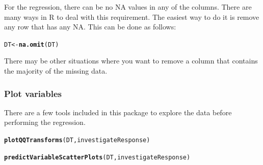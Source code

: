 \documentclass[a4paper,11pt]{article}\usepackage[]{graphicx}\usepackage[]{color}
\makeatletter
\newcommand{\hlkwd}[1]{\textcolor[rgb]{0.737,0.353,0.396}{\textbf{#1}}}%
\newenvironment{kframe}{%
 \def\at@end@of@kframe{}%
 \ifinner\ifhmode%
  \def\at@end@of@kframe{\end{minipage}}%
  \begin{minipage}{\columnwidth}%
 \fi\fi%
 \def\FrameCommand##1{\hskip\@totalleftmargin \hskip-\fboxsep
 \colorbox{shadecolor}{##1}\hskip-\fboxsep
     \hskip-\linewidth \hskip-\@totalleftmargin \hskip\columnwidth}%
 \MakeFramed {\advance\hsize-\width
   \@totalleftmargin\z@ \linewidth\hsize
   \@setminipage}}%
 {\par\unskip\endMakeFramed%
 \at@end@of@kframe}
\newenvironment{knitrout}{}{} %
\makeatother
\begin{document}
For the regression, there can be no NA values in any of the columns. There are many ways in R to deal with this requirement. The easiest way to do it is remove any row that has any NA. This can be done as follows:

\begin{knitrout}
\color{fgcolor}\begin{kframe}
\begin{alltt}
DT <- \hlkwd{na.omit}(DT)
\end{alltt}


{\ttfamily\noindent\bfseries\color{errorcolor}{Error: object 'DT' not found}}\end{kframe}
\end{knitrout}


There may be other situations where you want to remove a column that contains the majority of the missing data.

\subsubsection{Plot variables}
There are a few tools included in this package to explore the data before performing the regression.

\begin{knitrout}
\color{fgcolor}\begin{kframe}
\begin{alltt}
\hlkwd{plotQQTransforms}(DT,investigateResponse)
\end{alltt}


{\ttfamily\noindent\bfseries\color{errorcolor}{Error: object 'DT' not found}}\end{kframe}
\end{knitrout}



\begin{knitrout}
\color{fgcolor}\begin{kframe}
\begin{alltt}
\hlkwd{predictVariableScatterPlots}(DT,investigateResponse)
\end{alltt}


{\ttfamily\noindent\bfseries\color{errorcolor}{Error: object 'DT' not found}}\end{kframe}
\end{knitrout}
\end{document}
